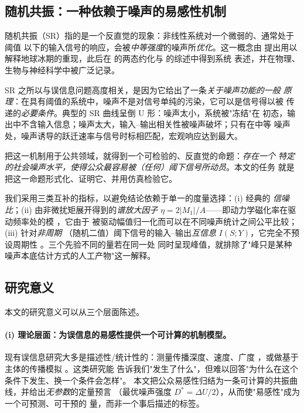 \subsection{随机共振：一种依赖于噪声的易感性机制}
随机共振（SR）指的是一个反直觉的现象：非线性系统对一个微弱的、通常处于阈值
以下的输入信号的响应，会被\emph{中等强度}的噪声所\emph{优化}。这一概念由
\citet{benzi1981,benzi1982} 提出用以解释地球冰期的重现，此后在
\citet{mcnamara1989} 的两态约化与 \citet{gammaitoni1998} 的综述中得到系统
表述，并在物理、生物与神经科学中被广泛记录。

SR 之所以与误信息问题高度相关，是因为它给出了一条\emph{关于噪声功能的一般
原理}：在具有阈值的系统中，噪声不是对信号单纯的污染，它可以是信号得以被
传递的\emph{必要条件}。典型的 SR 曲线呈倒 U 形：噪声太小，系统被"冻结"在
初态，输出中不含输入信息；噪声太大，输入--输出相关性被噪声破坏；只有在中等
噪声处，噪声诱导的跃迁速率与信号时标相匹配，宏观响应达到最大。

把这一机制用于公共领域，就得到一个可检验的、反直觉的命题：\emph{存在一个
特定的社会噪声水平，使得公众最容易被（任何）阈下信号所动员}。本文的任务
就是把这一命题形式化、证明它、并用仿真检验它。

我们采用三类互补的指标，以避免结论依赖于单一的度量选择：(i) 经典的
\emph{信噪比}；(ii) 由非微扰矩展开得到的\emph{谱放大因子}
$\eta=2|M_1|/A$——即动力学磁化率在驱动频率处的模 \citep{liu2018levy}，它由于
被驱动幅值归一化而可以在不同噪声统计之间公平比较；(iii) 针对\emph{非周期}
（随机二值）阈下信号的输入--输出\emph{互信息} $I(S;Y)$，它完全不预设周期性
\citep{kang2020aperiodic,patel2008,kosko2009}。三个先验不同的量若在同一处
同时呈现峰值，就排除了"峰只是某种噪声本底估计方式的人工产物"这一解释。

\subsection{研究意义}
\label{sec:significance}
本文的研究意义可以从三个层面陈述。

\paragraph{(i) 理论层面：为误信息的易感性提供一个可计算的机制模型。}
现有误信息研究大多是描述性/统计性的：测量传播深度、速度、广度
\citep{vosoughi2018}，或做基于主体的传播模拟 \citep{goel2012}。这类研究能
告诉我们"发生了什么"，但难以回答"为什么在这个条件下发生、换一个条件会怎样"。
本文把公众易感性归结为一条可计算的共振曲线，并给出\emph{无参数}的定量预言
（最优噪声强度 $D^{*}=\Delta U/2$），从而使"易感性"成为一个可预测、可干预的
量，而非一个事后描述的标签。

